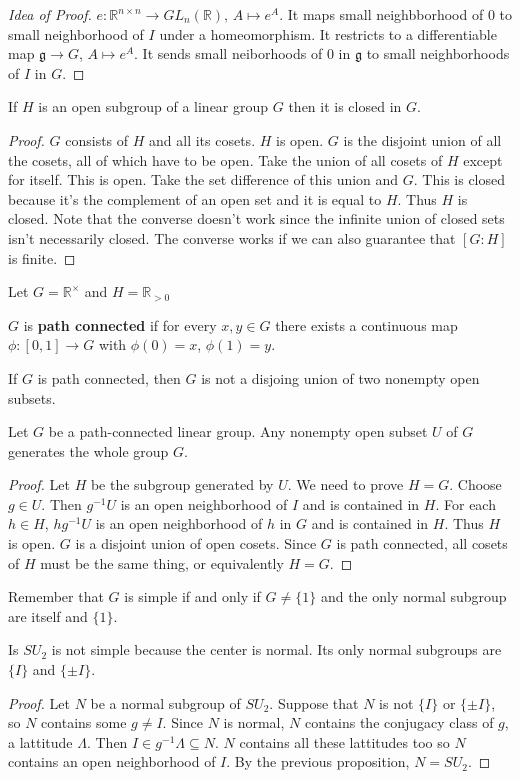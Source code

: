 \documentclass{article}
\newcommand{\vocab}[1]{\textbf{\color{blue!90}\boldmath #1}}
\newcommand{\R}{\mathbb{R}}
\newcommand{\ra}[1][]{\xrightarrow{#1}}
\begin{document}
\begin{proof}[Idea of Proof]
$e:\R^{n\times n}\ra GL_n(\R),\, A\mapsto e^A$. It maps small neighbborhood of 0 to small neighborhood of $I$ under a homeomorphism. It restricts to a differentiable map $\mathfrak g\ra G$, $A\mapsto e^A$. It sends small neiborhoods of 0 in $\mathfrak g$ to small neighborhoods of $I$ in $G$.
\end{proof}
\begin{proposition}
If $H$ is an open subgroup of a linear group $G$ then it is closed in $G$.
\end{proposition}
\begin{proof}
$G$ consists of $H$ and all its cosets. $H$ is open. $G$ is the disjoint union of all the cosets, all of which have to be open. Take the union of all cosets of $H$ except for itself. This is open. Take the set difference of this union and $G$. This is closed because it's the complement of an open set and it is equal to $H$. Thus $H$ is closed. Note that the converse doesn't work since the infinite union of closed sets isn't necessarily closed. The converse works if we can also guarantee that $[G:H]$ is finite.
\end{proof}
\begin{example}
Let $G=\R^\times $ and $H=\R_{>0}$
\end{example}
\begin{definition}
$G$ is \vocab{path connected} if for every $x,y\in G$ there exists a continuous map $\phi:[0,1]\ra G$ with $\phi(0)=x$, $\phi(1)=y$.
\end{definition}
\begin{fact}
If $G$ is path connected, then $G$ is not a disjoing union of two nonempty open subsets.
\end{fact}
\begin{proposition}
Let $G$ be a path-connected linear group. Any nonempty open subset $U$ of $G$ generates the whole group $G$.
\end{proposition}
\begin{proof}
Let $H$ be the subgroup generated by $U$. We need to prove $H=G$. Choose $g\in U$. Then $g^{-1}U$ is an open neighborhood of $I$ and is contained in $H$. For each $h\in H$, $hg^{-1}U$ is an open neighborhood of $h$ in $G$ and is contained in $H$. Thus $H$ is open. $G$ is a disjoint union of open cosets. Since $G$ is path connected, all cosets of $H$ must be the same thing, or equivalently $H=G$.
\end{proof}
Remember that $G$ is simple if and only if $G\neq \{1\}$ and the only normal subgroup are itself and $\{1\}$.
\begin{theorem}
Is $SU_2$ is not simple because the center is normal. Its only normal subgroups are $\{I\}$ and $\{\pm I\}$.
\end{theorem}
\begin{proof}
Let $N$ be a normal subgroup of $SU_2$. Suppose that $N$ is not $\{I\}$ or $\{\pm I\}$, so $N$ contains some $g\neq I$. Since $N$ is normal, $N$ contains the conjugacy class of $g$, a lattitude $\Lambda$. Then $I\in g^{-1}\Lambda \subseteq N$. $N$ contains all these lattitudes too so $N$ contains an open neighborhood of $I$. By the previous proposition, $N=SU_2$.
\end{proof}
\end{document}
